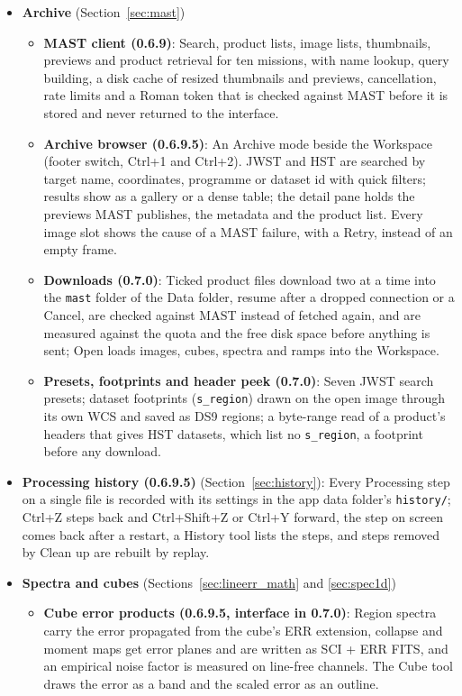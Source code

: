 \documentclass[11pt,a4paper]{article}
\newcommand{\code}[1]{\texttt{\small #1}}
\begin{document}
    \begin{itemize}[nosep]
    \item \textbf{Archive} (Section~\ref{sec:mast})
        \begin{itemize}[nosep]
        \item \textbf{MAST client (0.6.9)}: Search, product lists, image lists, thumbnails, previews and product retrieval for ten missions, with name lookup, query building, a disk cache of resized thumbnails and previews, cancellation, rate limits and a Roman token that is checked against MAST before it is stored and never returned to the interface.
        \item \textbf{Archive browser (0.6.9.5)}: An Archive mode beside the Workspace (footer switch, Ctrl+1 and Ctrl+2). JWST and HST are searched by target name, coordinates, programme or dataset id with quick filters; results show as a gallery or a dense table; the detail pane holds the previews MAST publishes, the metadata and the product list. Every image slot shows the cause of a MAST failure, with a Retry, instead of an empty frame.
        \item \textbf{Downloads (0.7.0)}: Ticked product files download two at a time into the \code{mast} folder of the Data folder, resume after a dropped connection or a Cancel, are checked against MAST instead of fetched again, and are measured against the quota and the free disk space before anything is sent; Open loads images, cubes, spectra and ramps into the Workspace.
        \item \textbf{Presets, footprints and header peek (0.7.0)}: Seven JWST search presets; dataset footprints (\code{s\_region}) drawn on the open image through its own WCS and saved as DS9 regions; a byte-range read of a product's headers that gives HST datasets, which list no \code{s\_region}, a footprint before any download.
        \end{itemize}
    \item \textbf{Processing history (0.6.9.5)} (Section~\ref{sec:history}): Every Processing step on a single file is recorded with its settings in the app data folder's \code{history/}; Ctrl+Z steps back and Ctrl+Shift+Z or Ctrl+Y forward, the step on screen comes back after a restart, a History tool lists the steps, and steps removed by Clean up are rebuilt by replay.
    \item \textbf{Spectra and cubes} (Sections~\ref{sec:lineerr_math} and \ref{sec:spec1d})
        \begin{itemize}[nosep]
        \item \textbf{Cube error products (0.6.9.5, interface in 0.7.0)}: Region spectra carry the error propagated from the cube's ERR extension, collapse and moment maps get error planes and are written as SCI + ERR FITS, and an empirical noise factor is measured on line-free channels. The Cube tool draws the error as a band and the scaled error as an outline.

\end{itemize}
\end{itemize}
\end{document}

